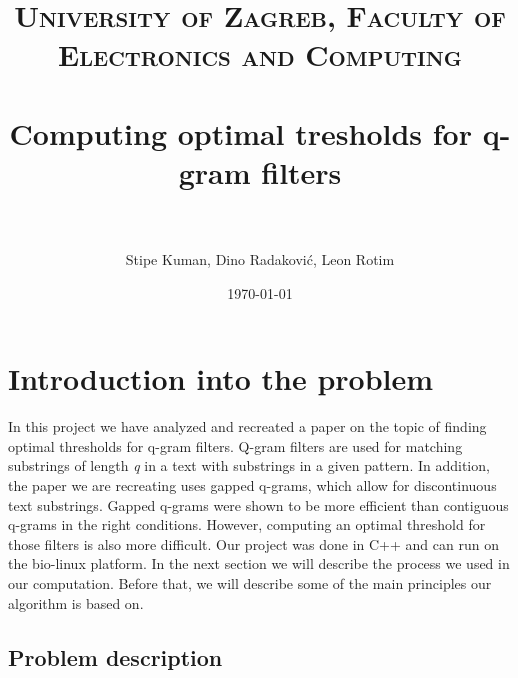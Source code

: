 \documentclass[paper=a4, fontsize=11pt]{scrartcl} %
\title{	
\normalfont \normalsize 
\textsc{University of Zagreb, Faculty of Electronics and Computing} \\ [25pt] %
\horrule{0.5pt} \\[0.4cm] %
\huge Computing optimal tresholds for q-gram filters \\ %
\horrule{2pt} \\[0.5cm] %
}
\author{Stipe Kuman, Dino Radaković, Leon Rotim} %
\date{\normalsize\today} %
\numberwithin{equation}{section} %
\numberwithin{figure}{section} %
\numberwithin{table}{section} %
\begin{document}
\maketitle %


\section{Introduction into the problem}

In this project we have analyzed and recreated a paper on the topic of finding optimal thresholds for q-gram filters. Q-gram filters
are used for matching substrings of length \textit{q} in a text with substrings in a given pattern. In addition, the paper we are recreating
uses gapped q-grams, which allow for discontinuous text substrings. Gapped q-grams were shown to be more efficient than 
contiguous q-grams in the right conditions. However, computing an optimal threshold for those filters is also more difficult. 
Our project was done in C++ and can run on the bio-linux platform.
In the next section we will describe the process we used in our computation. Before that, we will describe some of the main
principles our algorithm is based on.  %



\subsection{Problem description}
\end{document}
